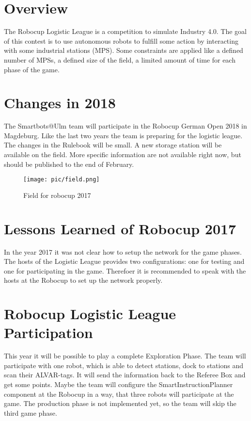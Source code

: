 \section{Overview}

The Robocup Logistic League is a competition to simulate Industry 4.0.  The goal of this contest is to use autonomous robots to fulfill some action by interacting with some industrial stations (MPS). Some constraints are applied like a defined number of MPSs, a defined size of the field, a limited amount of time for each phase of the game.

\section{Changes in 2018}

The Smartbots@Ulm team will participate in the Robocup German Open 2018 in Magdeburg. Like the last two years the team is preparing for the logistic league. The changes in the Rulebook will be small. A new storage station will be  available on the field. More specific information are not available right now, but should be published to the end of February.

\begin{figure}%
\centering
\texttt{[image: pic/field.png]}
\caption{Field for robocup 2017}
\label{fig:frog}
\end{figure}

\section{Lessons Learned of Robocup 2017}

In the year 2017 it was not clear how to setup the network for the game phases. The hosts of the Logistic League provides two configurations: one for testing and one for participating in the game. Therefoer it is recommended to speak with the hosts at the Robocup to set up the network properly. 

\section{Robocup Logistic League Participation}

This year it will be possible to play a complete Exploration Phase. The team will participate with one robot, which is able to detect stations, dock to stations and scan their ALVAR-tags. It will send the information back to the Referee Box and get some points. Maybe the team will configure the SmartInstructionPlanner component at the Robocup in a way, that three robots will participate at the game.
The production phase is not implemented yet, so the team will skip the third game phase.
